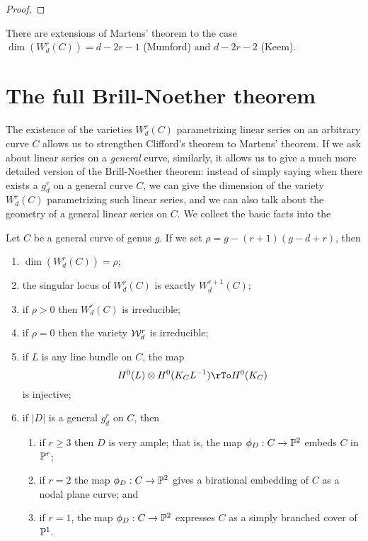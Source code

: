 \begin{proof}

\end{proof}

There are extensions of Martens' theorem to the case $\dim(W^r_d(C)) = d-2r-1$ (Mumford) and $d-2r-2$ (Keem).

\section{The full Brill-Noether theorem}

The existence of the varieties $W^r_d(C)$ parametrizing linear series on an arbitrary curve $C$ allows us to strengthen Clifford's theorem to Martens' theorem. If we ask about linear series on a \emph{general} curve, similarly, it allows us to give a much more detailed version of the Brill-Noether theorem: instead of simply saying when there exists a $g^r_d$ on a general curve $C$, we can give the dimension of the variety $W^r_d(C)$ parametrizing such linear series, and we can also talk about the geometry of a general linear series on $C$. We collect the basic facts into the 

\begin{theorem}
Let $C$ be a general curve of genus $g$. If we set $\rho = g - (r+1)(g-d+r)$, then
\begin{enumerate}
\item $\dim(W^r_d(C)) = \rho$;
\item the singular locus of $W^r_d(C)$ is exactly $W^{r+1}_d(C)$;
\item if $\rho > 0$ then $W^r_d(C)$ is irreducible;
\item if $\rho = 0$ then the variety $\cW^r_d$ is irreducible;
\item if $L$ is any line bundle on $C$, the map
$$
H^0(L) \otimes H^0(K_CL^{-1}) \rTo H^0(K_C)
$$
is injective;
\item if $|D|$ is a general $g^r_d$ on $C$, then
\begin{enumerate}
\item if $r \geq 3$ then $D$ is very ample; that is, the map $\phi_D : C \to \PP^2$   embeds $C$ in $\PP^r$;
\item if $r=2$ the map $\phi_D : C \to \PP^2$ gives a birational embedding of $C$ as a nodal plane curve; and 
\item if $r=1$, the map $\phi_D : C \to \PP^2$ expresses $C$ as a simply branched cover of $\PP^1$.
\end{enumerate}
\end{enumerate}
\end{theorem}

